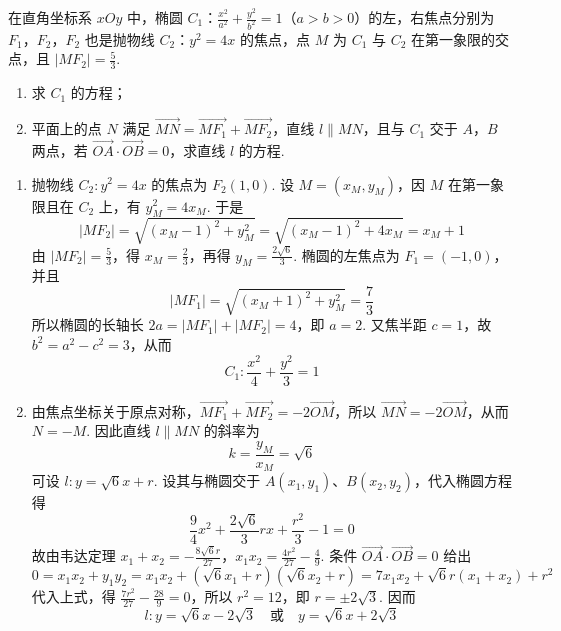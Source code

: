 \begin{problem}
在直角坐标系 \(xOy\) 中，椭圆 \(C_1\)：\(\frac{x^2}{a^2} + \frac{y^2}{b^2} = 1\)（\(a > b > 0\)）的左，右焦点分别为 \(F_1\)，\(F_2\)，\(F_2\) 也是抛物线 \(C_2\)：\(y^2 = 4x\) 的焦点，点 \(M\) 为 \(C_1\) 与 \(C_2\) 在第一象限的交点，且 \(|MF_2| = \frac{5}{3}\).

\begin{enumerate}
\item 求 \(C_1\) 的方程；
\item 平面上的点 \(N\) 满足 \(\overrightarrow{MN} = \overrightarrow{MF_1} + \overrightarrow{MF_2}\)，直线 \(l\parallel MN\)，且与 \(C_1\) 交于 \(A\)，\(B\) 两点，若 \(\overrightarrow{OA} \cdot \overrightarrow{OB} = 0\)，求直线 \(l\) 的方程.
\end{enumerate}

\begin{solution}
\begin{enumerate}
\item 抛物线 \(C_2:y^2=4x\) 的焦点为 \(F_2\left(1,0\right)\). 设 \(M=(x_M,y_M)\)，因 \(M\) 在第一象限且在 \(C_2\) 上，有 \(y_M^2=4x_M\). 于是
\[
|MF_2|=\sqrt{\left(x_M-1\right)^2+y_M^2}=\sqrt{\left(x_M-1\right)^2+4x_M}=x_M+1
\]
由 \(|MF_2|=\frac53\)，得 \(x_M=\frac23\)，再得 \(y_M=\frac{2\sqrt6}{3}\). 椭圆的左焦点为 \(F_1=(-1,0)\)，并且
\[
|MF_1|=\sqrt{\left(x_M+1\right)^2+y_M^2}=\frac73
\]
所以椭圆的长轴长 \(2a=|MF_1|+|MF_2|=4\)，即 \(a=2\). 又焦半距 \(c=1\)，故 \(b^2=a^2-c^2=3\)，从而
\[
C_1:\frac{x^2}{4}+\frac{y^2}{3}=1
\]
\item 由焦点坐标关于原点对称，\(\overrightarrow{MF_1}+\overrightarrow{MF_2}=-2\overrightarrow{OM}\)，所以 \(\overrightarrow{MN}=-2\overrightarrow{OM}\)，从而 \(N=-M\). 因此直线 \(l\parallel MN\) 的斜率为
\[
k=\frac{y_M}{x_M}=\sqrt6
\]
可设 \(l:y=\sqrt6x+r\). 设其与椭圆交于 \(A(x_1,y_1)\)、\(B(x_2,y_2)\)，代入椭圆方程得
\[
\frac94x^2+\frac{2\sqrt6}{3}rx+\frac{r^2}{3}-1=0
\]
故由韦达定理
\(x_1+x_2=-\frac{8\sqrt6 r}{27}\)，\(x_1x_2=\frac{4r^2}{27}-\frac49\).
条件 \(\overrightarrow{OA}\cdot\overrightarrow{OB}=0\) 给出
\[
0=x_1x_2+y_1y_2
=x_1x_2+\left(\sqrt6x_1+r\right)\left(\sqrt6x_2+r\right)
=7x_1x_2+\sqrt6r(x_1+x_2)+r^2
\]
代入上式，得 \(\frac{7r^2}{27}-\frac{28}{9}=0\)，所以 \(r^2=12\)，即 \(r=\pm2\sqrt3\). 因而
\[
l:y=\sqrt6x-2\sqrt3\quad\text{或}\quad y=\sqrt6x+2\sqrt3
\]
\end{enumerate}
\end{solution}
\end{problem}

